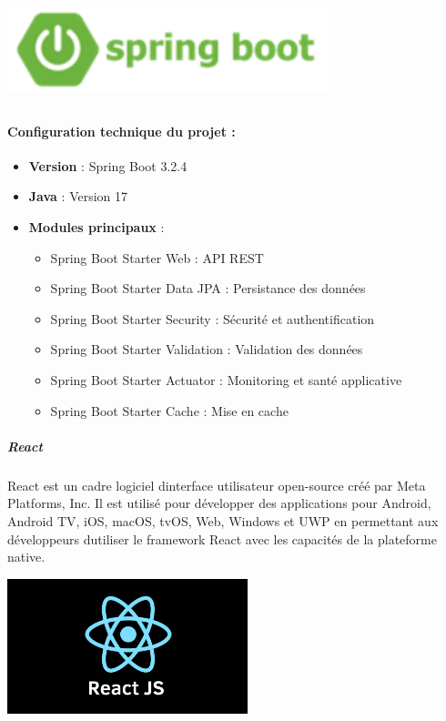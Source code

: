 \documentclass[12pt,a4paper,twoside]{report}
\begin{document}
\includegraphics[width=3.66042in,height=1.15069in]{latex_media/media/image23.png}

\hypertarget{configuration-technique-du-projet}{%
\paragraph{Configuration technique du projet
:}\label{configuration-technique-du-projet}}

\begin{itemize}
\item
  \textbf{Version} : Spring Boot 3.2.4
\item
  \textbf{Java} : Version 17
\item
  \textbf{Modules principaux} :

  \begin{itemize}
  \item
    Spring Boot Starter Web : API REST
  \item
    Spring Boot Starter Data JPA : Persistance des données
  \item
    Spring Boot Starter Security : Sécurité et authentification
  \item
    Spring Boot Starter Validation : Validation des données
  \item
    Spring Boot Starter Actuator : Monitoring et santé applicative
  \item
    Spring Boot Starter Cache : Mise en cache
  \end{itemize}
\end{itemize}

\hypertarget{react}{%
\subparagraph{React}\label{react}}

React est un cadre logiciel d\textquotesingle interface utilisateur
open-source créé par Meta Platforms, Inc. Il est utilisé pour développer
des applications pour Android, Android TV, iOS, macOS, tvOS, Web,
Windows et UWP en permettant aux développeurs d\textquotesingle utiliser
le framework React avec les capacités de la plateforme native.

\includegraphics[width=2.74792in,height=1.54583in]{latex_media/media/image24.png}
\end{document}

